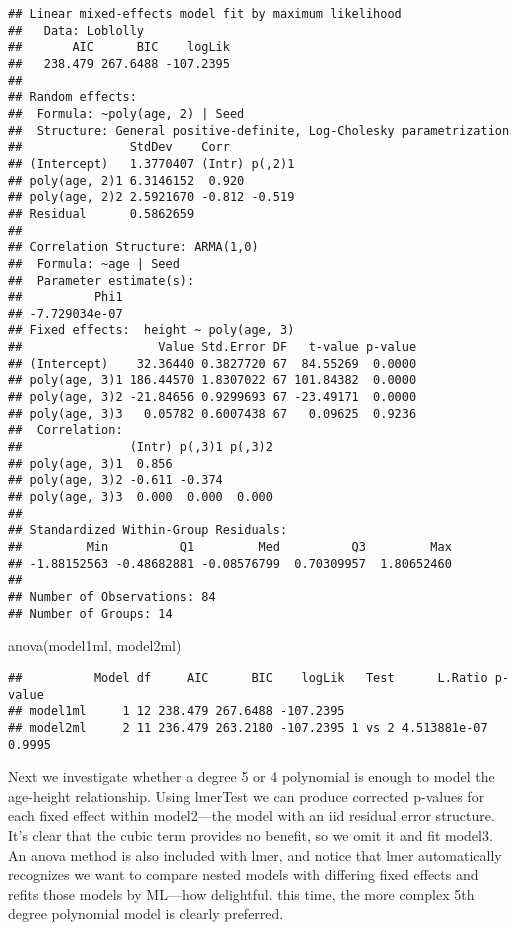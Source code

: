 \documentclass[
]{book}
\newenvironment{Shaded}{\begin{snugshade}}{\end{snugshade}}
\newcommand{\FunctionTok}[1]{\textcolor[rgb]{0.00,0.00,0.00}{#1}}
\newcommand{\NormalTok}[1]{#1}
\begin{document}
\begin{verbatim}
## Linear mixed-effects model fit by maximum likelihood
##   Data: Loblolly 
##       AIC      BIC    logLik
##   238.479 267.6488 -107.2395
## 
## Random effects:
##  Formula: ~poly(age, 2) | Seed
##  Structure: General positive-definite, Log-Cholesky parametrization
##               StdDev    Corr         
## (Intercept)   1.3770407 (Intr) p(,2)1
## poly(age, 2)1 6.3146152  0.920       
## poly(age, 2)2 2.5921670 -0.812 -0.519
## Residual      0.5862659              
## 
## Correlation Structure: ARMA(1,0)
##  Formula: ~age | Seed 
##  Parameter estimate(s):
##          Phi1 
## -7.729034e-07 
## Fixed effects:  height ~ poly(age, 3) 
##                   Value Std.Error DF   t-value p-value
## (Intercept)    32.36440 0.3827720 67  84.55269  0.0000
## poly(age, 3)1 186.44570 1.8307022 67 101.84382  0.0000
## poly(age, 3)2 -21.84656 0.9299693 67 -23.49171  0.0000
## poly(age, 3)3   0.05782 0.6007438 67   0.09625  0.9236
##  Correlation: 
##               (Intr) p(,3)1 p(,3)2
## poly(age, 3)1  0.856              
## poly(age, 3)2 -0.611 -0.374       
## poly(age, 3)3  0.000  0.000  0.000
## 
## Standardized Within-Group Residuals:
##         Min          Q1         Med          Q3         Max 
## -1.88152563 -0.48682881 -0.08576799  0.70309957  1.80652460 
## 
## Number of Observations: 84
## Number of Groups: 14
\end{verbatim}

\begin{Shaded}
\begin{Highlighting}[]
\FunctionTok{anova}\NormalTok{(model1ml, model2ml)}
\end{Highlighting}
\end{Shaded}

\begin{verbatim}
##          Model df     AIC      BIC    logLik   Test      L.Ratio p-value
## model1ml     1 12 238.479 267.6488 -107.2395                            
## model2ml     2 11 236.479 263.2180 -107.2395 1 vs 2 4.513881e-07  0.9995
\end{verbatim}

Next we investigate whether a degree 5 or 4 polynomial is enough to model the age-height relationship. Using lmerTest we can produce corrected p-values for each fixed effect within model2---the model with an iid residual error structure. It's clear that the cubic term provides no benefit, so we omit it and fit model3. An anova method is also included with lmer, and notice that lmer automatically recognizes we want to compare nested models with differing fixed effects and refits those models by ML---how delightful. this time, the more complex 5th degree polynomial model is clearly preferred.
\end{document}
